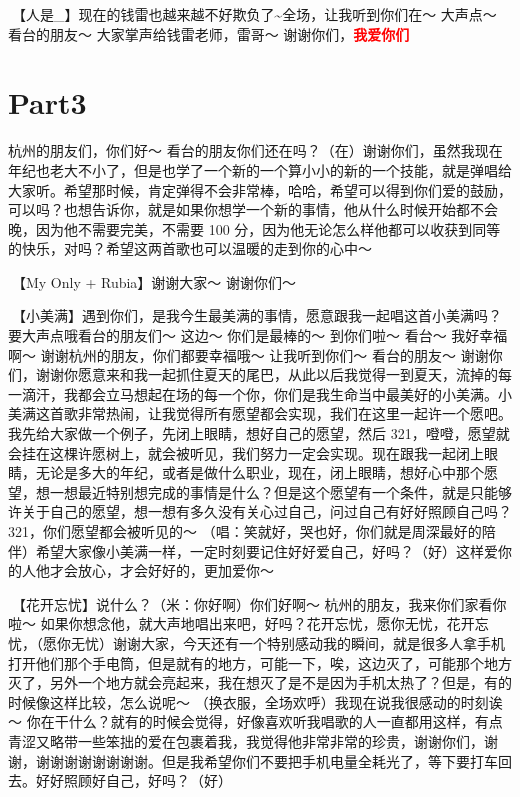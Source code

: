 \documentclass[
]{book}
\begin{document}
🎵【人是\_】现在的钱雷也越来越不好欺负了\textasciitilde 全场，让我听到你们在～ 大声点～ 看台的朋友～ 大家掌声给钱雷老师，雷哥～ 谢谢你们，\textbf{\textcolor{red}{我爱你们~} }

\section{Part3}\label{hangzhou-20240824-part3}

杭州的朋友们，你们好～ 看台的朋友你们还在吗？（在）谢谢你们，虽然我现在年纪也老大不小了，但是也学了一个新的一个算小小的新的一个技能，就是弹唱给大家听。希望那时候，肯定弹得不会非常棒，哈哈，希望可以得到你们爱的鼓励，可以吗？也想告诉你，就是如果你想学一个新的事情，他从什么时候开始都不会晚，因为他不需要完美，不需要 100 分，因为他无论怎么样他都可以收获到同等的快乐，对吗？希望这两首歌也可以温暖的走到你的心中～

🎵【My Only + Rubia】谢谢大家～ 谢谢你们～

🎵【小美满】遇到你们，是我今生最美满的事情，愿意跟我一起唱这首小美满吗？要大声点哦看台的朋友们～ 这边～ 你们是最棒的～ 到你们啦～ 看台～ 我好幸福啊～ 谢谢杭州的朋友，你们都要幸福哦～ 让我听到你们～ 看台的朋友～ 谢谢你们，谢谢你愿意来和我一起抓住夏天的尾巴，从此以后我觉得一到夏天，流掉的每一滴汗，我都会立马想起在场的每一个你，你们是我生命当中最美好的小美满。小美满这首歌非常热闹，让我觉得所有愿望都会实现，我们在这里一起许一个愿吧。我先给大家做一个例子，先闭上眼睛，想好自己的愿望，然后 321，噔噔，愿望就会挂在这棵许愿树上，就会被听见，我们努力一定会实现。现在跟我一起闭上眼睛，无论是多大的年纪，或者是做什么职业，现在，闭上眼睛，想好心中那个愿望，想一想最近特别想完成的事情是什么？但是这个愿望有一个条件，就是只能够许关于自己的愿望，想一想有多久没有关心过自己，问过自己有好好照顾自己吗？ 321，你们愿望都会被听见的～ （唱：笑就好，哭也好，你们就是周深最好的陪伴）希望大家像小美满一样，一定时刻要记住好好爱自己，好吗？（好）这样爱你的人他才会放心，才会好好的，更加爱你～

🎵【花开忘忧】说什么？（米：你好啊）你们好啊～ 杭州的朋友，我来你们家看你啦～ 如果你想念他，就大声地唱出来吧，好吗？花开忘忧，愿你无忧，花开忘忧，（愿你无忧）谢谢大家，今天还有一个特别感动我的瞬间，就是很多人拿手机打开他们那个手电筒，但是就有的地方，可能一下，唉，这边灭了，可能那个地方灭了，另外一个地方就会亮起来，我在想灭了是不是因为手机太热了？但是，有的时候像这样比较，怎么说呢～ （换衣服，全场欢呼）我现在说我很感动的时刻诶～ 你在干什么？就有的时候会觉得，好像喜欢听我唱歌的人一直都用这样，有点青涩又略带一些笨拙的爱在包裹着我，我觉得他非常非常的珍贵，谢谢你们，谢谢，谢谢谢谢谢谢谢谢。但是我希望你们不要把手机电量全耗光了，等下要打车回去。好好照顾好自己，好吗？（好）
\end{document}
